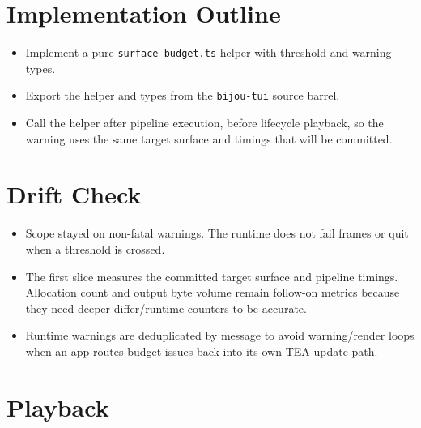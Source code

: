 \section{Implementation Outline}\label{record-157-implementation-outline}

\begin{itemize}
\tightlist
\item
  Implement a pure \texttt{s\allowbreak{}u\allowbreak{}r\allowbreak{}f\allowbreak{}a\allowbreak{}c\allowbreak{}e\allowbreak{}-\allowbreak{}b\allowbreak{}u\allowbreak{}d\allowbreak{}g\allowbreak{}e\allowbreak{}t\allowbreak{}.\allowbreak{}t\allowbreak{}s} helper with threshold and warning types.
\item
  Export the helper and types from the \texttt{b\allowbreak{}i\allowbreak{}j\allowbreak{}o\allowbreak{}u\allowbreak{}-\allowbreak{}t\allowbreak{}u\allowbreak{}i} source barrel.
\item
  Call the helper after pipeline execution, before lifecycle playback, so the warning uses the same target surface and timings that will be committed.
\end{itemize}

\section{Drift Check}\label{record-157-drift-check}

\begin{itemize}
\tightlist
\item
  Scope stayed on non-fatal warnings. The runtime does not fail frames or quit when a threshold is crossed.
\item
  The first slice measures the committed target surface and pipeline timings. Allocation count and output byte volume remain follow-on metrics because they need deeper differ/runtime counters to be accurate.
\item
  Runtime warnings are deduplicated by message to avoid warning/render loops when an app routes budget issues back into its own TEA update path.
\end{itemize}

\section{Playback}\label{record-157-playback}

